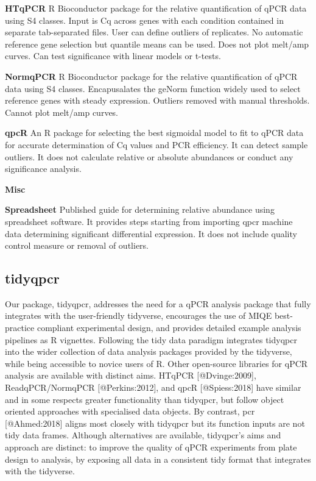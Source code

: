 \documentclass{SBCbookchapter}
\begin{document}
\textbf{HTqPCR} R Bioconductor package for the relative quantification of qPCR data using S4 classes. Input is Cq across genes with each condition contained in separate tab-separated files. User can define outliers of replicates. No automatic reference gene selection but quantile means can be used. Does not plot melt/amp curves. Can test significance with linear models or t-tests. \cite{Dvinge2009}

\textbf{NormqPCR}  R Bioconductor package for the relative quantification of qPCR data using S4 classes. Encapusalates the geNorm function widely used to select reference genes with steady expression. Outliers removed with manual thresholds. Cannot plot melt/amp curves. \cite{Perkins2012}

\textbf{qpcR} An R package for selecting the best sigmoidal model to fit to qPCR data for accurate determination of Cq values and PCR efficiency. It can detect sample outliers. It does not calculate relative or absolute abundances or conduct any significance analysis. \cite{Ritz2008}

\textbf{Misc}

\textbf{Spreadsheet} Published guide for determining relative abundance using spreadsheet software. It provides steps starting from importing qpcr machine data determining significant differential expression. It does not include quality control measure or removal of outliers. \cite{Ng2021}

\subsection{tidyqpcr}

Our package, tidyqpcr, addresses the need for a qPCR analysis package that fully integrates with the user-friendly tidyverse, encourages the use of MIQE best-practice compliant experimental design, and provides detailed example analysis pipelines as R vignettes. Following the tidy data paradigm integrates tidyqpcr into the wider collection of data analysis packages provided by the tidyverse, while being accessible to novice users of R. Other open-source libraries for qPCR analysis are available with distinct aims. HTqPCR [@Dvinge:2009], ReadqPCR/NormqPCR [@Perkins:2012], and qpcR [@Spiess:2018] have similar and in some respects greater functionality than tidyqpcr, but follow object oriented approaches with specialised data objects. By contrast, pcr [@Ahmed:2018] aligns most closely with tidyqpcr but its function inputs are not tidy data frames. Although alternatives are available, tidyqpcr's aims and approach are distinct: to improve the quality of qPCR experiments from plate design to analysis, by exposing all data in a consistent tidy format that integrates with the tidyverse.
\end{document}

